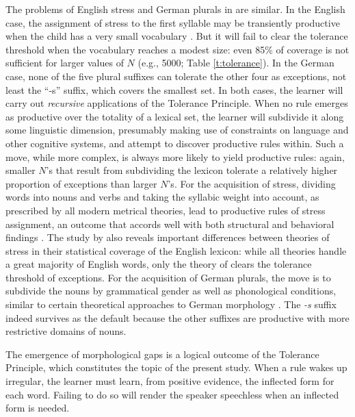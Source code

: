 \documentclass[output=paper,
modfonts
]{LSP/langsci}
\begin{document}
The problems of English stress and German plurals in  are
similar. In the English case,  the assignment of stress to the first
syllable may be transiently productive when the child has a very small
vocabulary \citep{Kehoe1997a, LY2013}. But it will fail to clear the tolerance
threshold when the vocabulary reaches a modest size:  even 85\% of
coverage is not sufficient for larger values of $N$ (e.g., 5000;  Table 
\ref{t:tolerance}). In the German case, none of the five plural
suffixes can tolerate the other four as exceptions, not least the
``-s'' suffix,  which covers the smallest set. In both cases, the
learner will carry out \textit{recursive} 
applications of the Tolerance Principle. When  no rule emerges as
productive over the totality of a lexical set, the learner will
subdivide it along some linguistic dimension, presumably making use of 
constraints on language and other cognitive systems,  and attempt
to discover productive rules within. Such a move, while more complex, 
is always more likely to yield productive rules: again, smaller $N$'s
that result from subdividing the lexicon tolerate a relatively higher
proportion of exceptions than larger $N$'s.  For the acquisition of
stress, dividing words into nouns and verbs and taking the syllabic
weight into account, as prescribed by all modern metrical theories, 
lead to productive rules of stress assignment, an outcome that accords
well with both structural and behavioral findings 
\citep{Ladefoged1968, Baker1976, Kelly1992, Guion2003}. The study by
\citet{LY2013} also reveals important differences between theories of
stress in their statistical
coverage  of the English lexicon: while all theories handle a great
majority of English words, only the theory of \citealt{Halle1998}
clears the tolerance threshold of exceptions.  For the acquisition of German
plurals, the move is to subdivide the nouns by grammatical gender as
well as phonological conditions, similar to certain theoretical
approaches to German morphology \citep[e.g.,][]{Wiese1996}. The \textit{-s} suffix indeed survives as the default because the other suffixes
are productive with more restrictive domains of nouns.  

The emergence of  morphological gaps is a logical outcome of the Tolerance
Principle, which constitutes the topic of the present study. When a
rule wakes up irregular, the learner must learn, from positive
evidence, the inflected form for each word. Failing to do so 
will render the speaker  speechless when an inflected
form is needed. 
\end{document}

